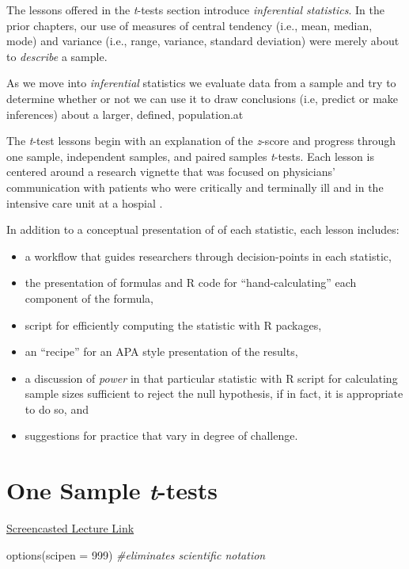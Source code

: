 \documentclass[
  11pt,
]{book}
\newenvironment{Shaded}{\begin{snugshade}}{\end{snugshade}}
\newcommand{\AttributeTok}[1]{\textcolor[rgb]{0.77,0.63,0.00}{#1}}
\newcommand{\CommentTok}[1]{\textcolor[rgb]{0.56,0.35,0.01}{\textit{#1}}}
\newcommand{\DecValTok}[1]{\textcolor[rgb]{0.00,0.00,0.81}{#1}}
\newcommand{\FunctionTok}[1]{\textcolor[rgb]{0.00,0.00,0.00}{#1}}
\newcommand{\NormalTok}[1]{#1}
\providecommand{\tightlist}{%
  \setlength{\itemsep}{0pt}\setlength{\parskip}{0pt}}
\begin{document}
The lessons offered in the \emph{t}-tests section introduce \emph{inferential statistics}. In the prior chapters, our use of measures of central tendency (i.e., mean, median, mode) and variance (i.e., range, variance, standard deviation) were merely about to \emph{describe} a sample.

As we move into \emph{inferential} statistics we evaluate data from a sample and try to determine whether or not we can use it to draw conclusions (i.e, predict or make inferences) about a larger, defined, population.at

The \emph{t}-test lessons begin with an explanation of the \emph{z}-score and progress through one sample, independent samples, and paired samples \emph{t}-tests. Each lesson is centered around a research vignette that was focused on physicians' communication with patients who were critically and terminally ill and in the intensive care unit at a hospial \citep{elliott_differences_2016}.

In addition to a conceptual presentation of of each statistic, each lesson includes:

\begin{itemize}
\tightlist
\item
  a workflow that guides researchers through decision-points in each statistic,
\item
  the presentation of formulas and R code for ``hand-calculating'' each component of the formula,
\item
  script for efficiently computing the statistic with R packages,
\item
  an ``recipe'' for an APA style presentation of the results,
\item
  a discussion of \emph{power} in that particular statistic with R script for calculating sample sizes sufficient to reject the null hypothesis, if in fact, it is appropriate to do so, and
\item
  suggestions for practice that vary in degree of challenge.
\end{itemize}

\hypertarget{tOneSample}{%
\chapter{\texorpdfstring{One Sample \emph{t}-tests}{One Sample t-tests}}\label{tOneSample}}

\href{link\%20here}{Screencasted Lecture Link}

\begin{Shaded}
\begin{Highlighting}[]
\FunctionTok{options}\NormalTok{(}\AttributeTok{scipen =} \DecValTok{999}\NormalTok{)  }\CommentTok{\#eliminates scientific notation}
\end{Highlighting}
\end{Shaded}
\end{document}
